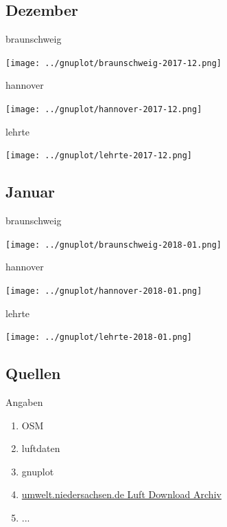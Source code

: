 \documentclass[aspectratio=169]{beamer} %
\begin{document}
\subsection{Dezember}
\begin{frame}{braunschweig}
  \begin{center}
    \texttt{[image: ../gnuplot/braunschweig-2017-12.png]}
  \end{center}
\end{frame}
\begin{frame}{hannover}
  \begin{center}
    \texttt{[image: ../gnuplot/hannover-2017-12.png]}
  \end{center}
\end{frame}
\begin{frame}{lehrte}
  \begin{center}
    \texttt{[image: ../gnuplot/lehrte-2017-12.png]}
  \end{center}
\end{frame}

\subsection{Januar}
\begin{frame}{braunschweig}
  \begin{center}
    \texttt{[image: ../gnuplot/braunschweig-2018-01.png]}
  \end{center}
\end{frame}
\begin{frame}{hannover}
  \begin{center}
    \texttt{[image: ../gnuplot/hannover-2018-01.png]}
  \end{center}
\end{frame}
\begin{frame}{lehrte}
  \begin{center}
    \texttt{[image: ../gnuplot/lehrte-2018-01.png]}
  \end{center}
\end{frame}

\subsection{Quellen}
\begin{frame}{Angaben}
  \begin{enumerate}
  \item OSM
  \item luftdaten
  \item gnuplot
  \item \href{https://www.umwelt.niedersachsen.de/themen/luft/luen/aktuelle_messwerte/archiv/download/}{umwelt.niedersachsen.de Luft Download Archiv}
  \item ...
  \end{enumerate}
\end{frame}
\end{document}
